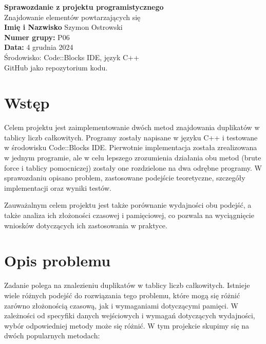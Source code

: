 \documentclass[a4paper,12pt]{article}
\begin{document}
 

\begin{titlepage}
    \centering
    \vspace*{1cm}
    
    {\Huge \textbf{Sprawozdanie z projektu programistycznego}}\\[1cm]
    
    {\LARGE Znajdowanie elementów powtarzających się}\\[1cm]
    
    \vspace{1cm}
    \textbf{Imię i Nazwisko} Szymon Ostrowski \\
    \textbf{Numer grupy:} P06\\
    \textbf{Data:} 4 grudnia 2024\\
    
    \vfill
    {\large Środowisko: Code::Blocks IDE, język C++}\\
    \vspace{0.5cm}
    {\large GitHub jako repozytorium kodu.}\\
    
    \vfill
\end{titlepage}

\newpage
\tableofcontents
\newpage

\section{Wstęp}
Celem projektu jest zaimplementowanie dwóch metod znajdowania duplikatów w tablicy liczb całkowitych. Programy zostały napisane w języku C++ i testowane w środowisku Code::Blocks IDE. Pierwotnie implementacja została zrealizowana w jednym programie, ale w celu lepszego zrozumienia działania obu metod (brute force i tablicy pomocniczej) zostały one rozdzielone na dwa odrębne programy. W sprawozdaniu opisano problem, zastosowane podejście teoretyczne, szczegóły implementacji oraz wyniki testów.

Zauważalnym celem projektu jest także porównanie wydajności obu podejść, a także analiza ich złożoności czasowej i pamięciowej, co pozwala na wyciągnięcie wniosków dotyczących ich zastosowania w praktyce.

\section{Opis problemu}
Zadanie polega na znalezieniu duplikatów w tablicy liczb całkowitych. Istnieje wiele różnych podejść do rozwiązania tego problemu, które mogą się różnić zarówno złożonością czasową, jak i wymaganiami dotyczącymi pamięci. W zależności od specyfiki danych wejściowych i wymagań dotyczących wydajności, wybór odpowiedniej metody może się różnić. W tym projekcie skupimy się na dwóch popularnych metodach:
\end{document}

